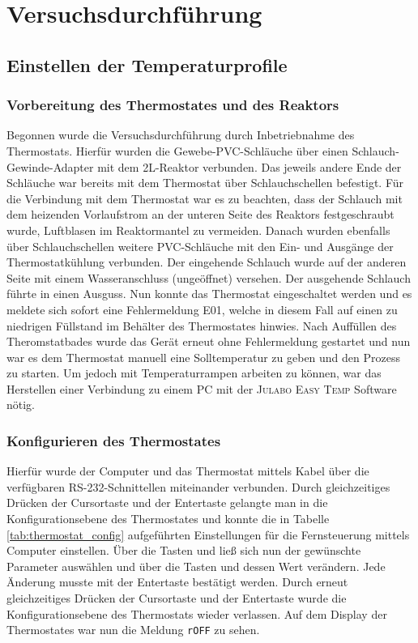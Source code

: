 \section{Versuchsdurchführung}
\label{sec:durchfuerung}

\subsection{Einstellen der Temperaturprofile}
\subsubsection*{Vorbereitung des Thermostates und des Reaktors}
Begonnen wurde die Versuchsdurchführung durch Inbetriebnahme des Thermostats. Hierfür wurden die Gewebe-PVC-Schläuche über einen Schlauch-Gewinde-Adapter mit dem 2L-Reaktor verbunden. Das jeweils andere Ende der Schläuche war bereits mit dem Thermostat über Schlauchschellen befestigt. Für die Verbindung mit dem Thermostat war es zu beachten, dass der Schlauch mit dem heizenden Vorlaufstrom an der unteren Seite des Reaktors festgeschraubt wurde, Luftblasen im Reaktormantel zu vermeiden. Danach wurden ebenfalls über Schlauchschellen weitere PVC-Schläuche mit den Ein- und Ausgänge der Thermostatkühlung verbunden. Der eingehende Schlauch wurde auf der anderen Seite mit einem Wasseranschluss (ungeöffnet) versehen. Der ausgehende Schlauch führte in einen Ausguss. Nun konnte das Thermostat eingeschaltet werden und es meldete sich sofort eine Fehlermeldung E01, welche in diesem Fall auf einen zu niedrigen Füllstand im Behälter des Thermostates hinwies. Nach Auffüllen des Theromstatbades wurde das Gerät erneut ohne Fehlermeldung gestartet und nun war es dem Thermostat manuell eine Solltemperatur zu geben und den Prozess zu starten. Um jedoch mit Temperaturrampen arbeiten zu können, war das Herstellen einer Verbindung zu einem PC mit der \textsc{Julabo Easy Temp} Software nötig.

\subsubsection*{Konfigurieren des Thermostates}
Hierfür wurde der Computer und das Thermostat mittels Kabel über die verfügbaren RS-232-Schnittellen miteinander verbunden. Durch gleichzeitiges Drücken der Cursortaste \keys{\arrowkeyleft} und der Entertaste \keys{\return} gelangte man in die Konfigurationsebene des Thermostates und konnte die in Tabelle \ref{tab:thermostat_config} aufgeführten Einstellungen für die Fernsteuerung mittels Computer einstellen. Über die Tasten \keys{\arrowkeyleft} und \keys{\arrowkeyright} ließ sich nun der gewünschte Parameter auswählen und über die Tasten \keys{\arrowkeyup} und  \keys{\arrowkeydown} dessen Wert verändern. Jede Änderung musste mit der Entertaste \keys{\return} bestätigt werden. Durch erneut gleichzeitiges Drücken der Cursortaste \keys{\arrowkeyleft} und der Entertaste \keys{\return} wurde die Konfigurationsebene des Thermostats wieder verlassen. Auf dem Display der Thermostates war nun die Meldung \texttt{rOFF} zu sehen.
